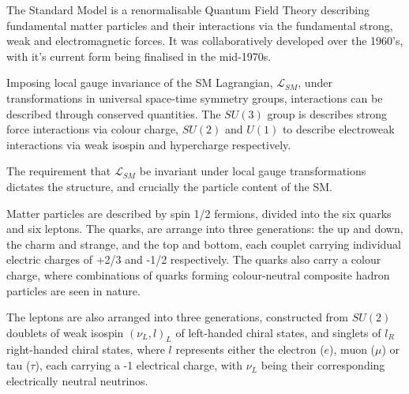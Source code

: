 The Standard Model is a renormalisable Quantum Field Theory describing
fundamental matter particles and their interactions via the fundamental strong,
weak and 
electromagnetic forces. It was collaboratively developed over the 1960's, with
it's current form being finalised in the mid-1970s.

Imposing local gauge invariance of the SM Lagrangian, $\mathcal{L}_{SM}$, under
transformations in universal space-time symmetry groups,
interactions can be described through conserved quantities. The $SU(3)$ group is
describes strong force interactions via colour charge, $SU(2)$ and $U(1)$ to
describe electroweak interactions via weak isospin and hypercharge respectively.

The requirement that $\mathcal{L}_{SM}$ be invariant under local gauge
transformations dictates the structure, and crucially the particle content of
the SM.

Matter particles are described by spin 1/2 fermions, divided into the six quarks
and six leptons. The quarks, are arrange into three generations: the up and
down, the charm and strange, and the top and bottom, each couplet carrying
individual electric charges of +2/3 and -1/2 respectively. The quarks also carry
a colour charge, where combinations of quarks forming colour-neutral composite
hadron particles are seen in nature.


The leptons are also arranged into three generations, constructed from $SU(2)$
doublets of weak isospin $(\nu_L, l)_L$ of left-handed chiral states, and
singlets of $l_R$ right-handed chiral states, where $l$ represents either the
electron ($e$), muon ($\mu$) or tau ($\tau$), each carrying a -1 electrical
charge, with $\nu_L$ being their corresponding electrically neutral neutrinos.


